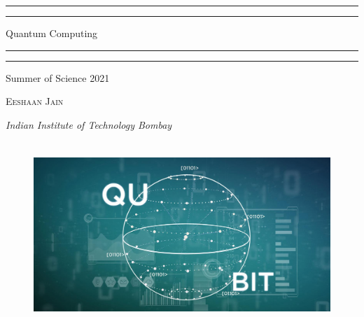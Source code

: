 \documentclass{package/notes}
\begin{document}
\begin{titlepage}


\centering %
		
\scshape %

\vspace*{\baselineskip} %


\rule{\textwidth}{1.6pt}\vspace*{-\baselineskip}\vspace*{2pt} %
\rule{\textwidth}{0.4pt} %

\vspace{0.75\baselineskip} %
{\huge { Quantum Computing }\\} %

\vspace{0.75\baselineskip} %

\rule{\textwidth}{0.4pt}\vspace*{-\baselineskip}\vspace{3.2pt} %
\rule{\textwidth}{1.6pt} %

\vspace{2\baselineskip} %

\LARGE{Summer of Science 2021} 

\vspace*{3\baselineskip} %



\vspace{0.5\baselineskip} 

{\scshape   \LARGE Eeshaan Jain\\ } %

\vspace{0.2\baselineskip} 

\textit{\Large Indian Institute of Technology Bombay} 

\vfill 

\begin{figure}[!h]
    \centering
    \includegraphics[width=13cm, height=7cm]{resources/quantum-computing-qubit.jpg}
\end{figure}
\vspace{0.3\baselineskip} 



\end{titlepage}
\end{document}
